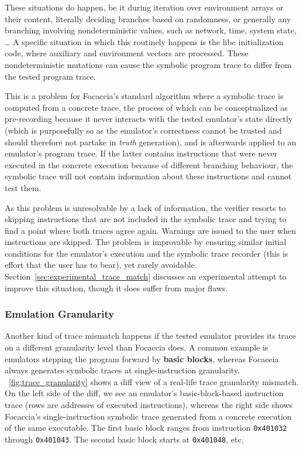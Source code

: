 These situations do happen, be it during iteration over environment arrays or their content, literally deciding branches
based on randomness, or generally any branching involving nondeterministic values, such as network, time, system state,
… A specific situation in which this routinely happens is the libc initialization code, where auxiliary and environment
vectors are processed. These nondeterministic mutations can cause the symbolic program trace to differ from the tested
program trace.

This is a problem for Focaccia's standard algorithm where a symbolic trace is computed from a concrete trace, the
process of which can be conceptualized as pre-recording because it never interacts with the tested emulator's state
directly (which is purposefully so as the emulator's correctness cannot be trusted and should therefore not partake in
\textit{truth} generation), and is afterwards applied to an emulator's program trace. If the latter contains
instructions that were never executed in the concrete execution because of different branching behaviour, the symbolic
trace will not contain information about these instructions and cannot test them.

As this problem is unresolvable by a lack of information, the verifier resorts to skipping instructions that are not
included in the symbolic trace and trying to find a point where both traces agree again. Warnings are issued to the user
when instructions are skipped. The problem is improvable by ensuring similar initial conditions for the emulator's
execution and the symbolic trace recorder (this is effort that the user has to bear), yet rarely avoidable.
Section~\ref{sec:experimental_trace_match} discusses an experimental attempt to improve this situation, though it does
suffer from major flaws.

\subsubsection{Emulation Granularity}

Another kind of trace mismatch happens if the tested emulator provides its trace on a different granularity level than
Focaccia does. A common example is emulators stepping the program forward by \textbf{basic blocks}, whereas Focaccia
always generates symbolic traces at single-instruction granularity. \figurename~\ref{fig:trace_granularity} shows a diff
view of a real-life trace granularity mismatch. On the left side of the diff, we see an emulator's basic-block-based
instruction trace (rows are addresses of executed instructions), whereas the right side shows Focaccia's
single-instruction symbolic trace generated from a concrete execution of the same executable. The first basic block
ranges from instruction \texttt{0x401032} through \texttt{0x401043}. The second basic block starts at \texttt{0x401048},
etc.

